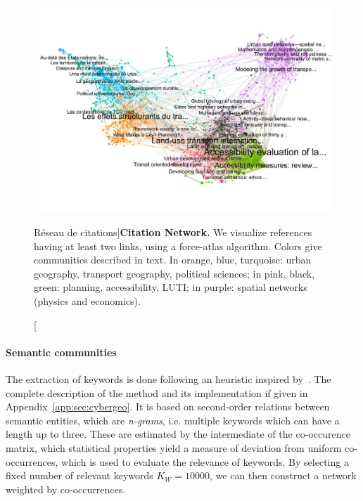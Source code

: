 \documentclass[galley]{jtlu-article-2col}
\begin{document}
\begin{figure}[!ht]
\includegraphics[width=\linewidth]{figures/2-2-2-fig-quantepistemo-citnw.jpg}
\caption[Citation Network][Réseau de citations]{\textbf{Citation Network.} We visualize references having at least two links, using a force-atlas algorithm. Colors give communities described in text. In orange, blue, turquoise: urban geography, transport geography, political sciences; in pink, black, green: planning, accessibility, LUTI; in purple: spatial networks (physics and economics).\label{fig:quantepistemo:citnw}}
\end{figure}

\paragraph{Semantic communities}


The extraction of keywords is done following an heuristic inspired by~\cite{chavalarias2013phylomemetic}. The complete description of the method and its implementation if given in Appendix~\ref{app:sec:cybergeo}. It is based on second-order relations between semantic entities, which are \emph{n-grams}, i.e. multiple keywords which can have a length up to three. These are estimated by the intermediate of the co-occurence matrix, which statistical properties yield a measure of deviation from uniform co-occurrences, which is used to evaluate the relevance of keywords. By selecting a fixed number of relevant keywords $K_W = 10000$, we can then construct a network weighted by co-occurrences.
\end{document}
